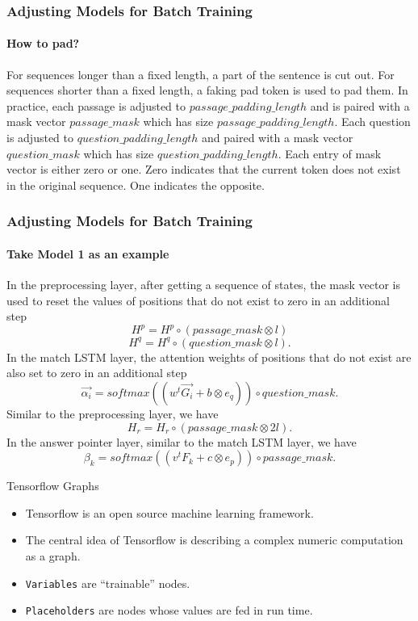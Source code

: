 \documentclass{beamer}
\begin{document}
\begin{frame}\frametitle{Adjusting Models for Batch Training}\framesubtitle{How to pad?}
    For sequences longer than a fixed length, a part of the sentence is cut out. For sequences shorter than a fixed length, a faking pad token is used to pad them. In practice, each passage is adjusted to $passage\_padding\_length$ and is paired with a mask vector $passage\_mask$ which has size $passage\_padding\_length$. Each question is adjusted to $question\_padding\_length$ and paired with a mask vector $question\_mask$ which has size $question\_padding\_length$. Each entry of mask vector is either zero or one. Zero indicates that the current token does not exist in the original sequence. One indicates the opposite.
\end{frame}
\begin{frame}\frametitle{Adjusting Models for Batch Training}\framesubtitle{Take Model 1 as an example}
    In the preprocessing layer, after getting a sequence of states, the mask vector is used to reset the values of positions that do not exist to zero in an additional step
    $$H^p = H^p \circ (passage\_mask \otimes l)$$
    $$H^q = H^q \circ (question\_mask \otimes l).$$
    In the match LSTM layer, the attention weights of positions that do not exist are also set to zero in an additional step
    $$\overrightarrow{\alpha _i} = softmax( (w^t\overrightarrow{G_i} + b \otimes e_q) ) \circ question\_mask .$$
    Similar to the preprocessing layer, we have
    $$H_r = H_r \circ (passage\_mask \otimes 2l).$$
    In the answer pointer layer, similar to the match LSTM layer, we have
    $$\beta _k = softmax( (v^tF_k + c \otimes e_p) ) \circ passage\_mask.$$


\end{frame}

\begin{frame}{Tensorflow Graphs}
    \begin{itemize}
        \item Tensorflow is an open source machine learning framework.
        \item The central idea of Tensorflow is describing a complex numeric computation as a graph.
        \item {\tt Variables} are ``trainable'' nodes.
        \item {\tt Placeholders} are nodes whose values are fed in run time.
    \end{itemize}
\end{frame}
\end{document}
